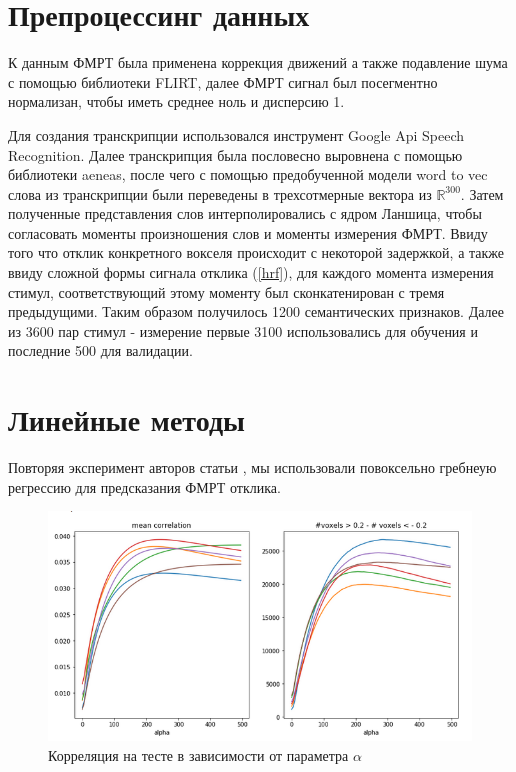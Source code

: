 \documentclass[pdftex,ptm,12pt,a4paper]{report}
\theoremstyle{definition}
\begin{document}
\section{Препроцессинг данных}

К данным ФМРТ была применена коррекция движений а также подавление шума с помощью библиотеки FLIRT, далее ФМРТ сигнал был посегментно нормализан, чтобы иметь среднее ноль и дисперсию 1. 

Для создания транскрипции использовался инструмент Google Api Speech Recognition. Далее транскрипция была пословесно выровнена с помощью библиотеки aeneas, после чего с помощью предобученной модели word to vec слова из транскрипции были переведены в трехсотмерные вектора из $\mathbb{R}^{300}.$ Затем полученные представления слов интерполировались с ядром Ланшица, чтобы согласовать моменты произношения слов и моменты измерения ФМРТ. Ввиду того что отклик конкретного вокселя происходит с некоторой задержкой, а также ввиду сложной формы сигнала отклика (\ref{hrf}), для каждого момента измерения стимул, соответствующий этому моменту был сконкатенирован с тремя предыдущими. Таким образом получилось 1200 семантических признаков. Далее из 3600 пар стимул - измерение первые 3100 использовались для обучения и последние 500 для валидации.


\section{Линейные методы}

Повторяя эксперимент авторов статьи \citep{huth2016natural}, мы использовали повоксельно гребнеую регрессию для предсказания ФМРТ отклика.

\begin{figure}[h]
\includegraphics[scale=0.6]{graphics/correlations2.png}
\centering
\caption{Корреляция на тесте в зависимости от параметра $\alpha$ }
\label{corr_many}
\end{figure}
\end{document}
